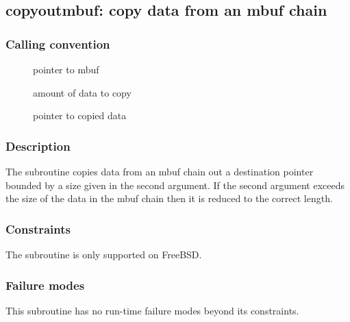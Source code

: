 \clearpage
{}
{}
\label{subr:copyoutmbuf}
\subsection*{copyoutmbuf: copy data from an mbuf chain}

\subsubsection*{Calling convention}

\begin{description}
\item[] pointer to mbuf
\item[] amount of data to copy
\item[] pointer to copied data
\end{description}

\subsubsection*{Description}

The  subroutine copies data from an mbuf
chain out a destination pointer bounded by a size given in the second
argument.  If the second argument exceeds the size of the data in the
mbuf chain then it is reduced to the correct length.

\subsubsection*{Constraints}

The  subroutine is only supported on FreeBSD.

\subsubsection*{Failure modes}

This subroutine has no run-time failure modes beyond its constraints.

